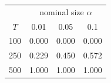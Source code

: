 % 
\begin{tabular}{cccc}
  \hline
  & \multicolumn{3}{c}{nominal size $\alpha$} \\
 $T$ & 0.01 & 0.05 & 0.1 \\
 \hline
100 & 0.000 & 0.000 & 0.000 \\ 
  250 & 0.229 & 0.450 & 0.572 \\ 
  500 & 1.000 & 1.000 & 1.000 \\ 
   \hline
\end{tabular}
